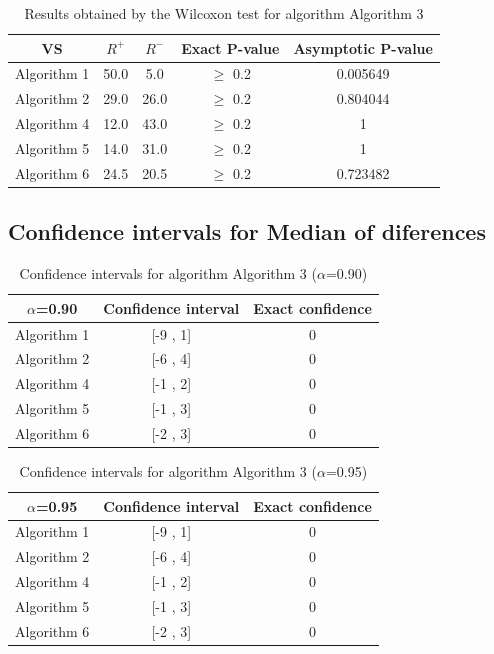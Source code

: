 \documentclass[a4paper,10pt]{article}
\begin{document}
\begin{table}[!htp]
\centering\small
\begin{tabular}{
|c|c|c|c|c|}
\hline
 VS & $R^{+}$ & $R^{-}$ & Exact P-value & Asymptotic P-value \\ \hline 
Algorithm 1 & 50.0 & 5.0 & $\geq$ 0.2 & 0.005649\\ \hline 
Algorithm 2 & 29.0 & 26.0 & $\geq$ 0.2 & 0.804044\\ \hline 
Algorithm 4 & 12.0 & 43.0 & $\geq$ 0.2 & 1\\ \hline 
Algorithm 5 & 14.0 & 31.0 & $\geq$ 0.2 & 1\\ \hline 
Algorithm 6 & 24.5 & 20.5 & $\geq$ 0.2 & 0.723482\\ \hline 

\end{tabular}
\caption{Results obtained by the Wilcoxon test for algorithm Algorithm 3}
\end{table}

\subsection{Confidence intervals for Median of diferences}

\begin{table}[!htp]
\centering\small
\begin{tabular}{
|c|c|c|}
\hline
 $\alpha$=0.90 & Confidence interval & Exact confidence \\ \hline 
Algorithm 1 & [-9 , 1] & 0\\ \hline 
Algorithm 2 & [-6 , 4] & 0\\ \hline 
Algorithm 4 & [-1 , 2] & 0\\ \hline 
Algorithm 5 & [-1 , 3] & 0\\ \hline 
Algorithm 6 & [-2 , 3] & 0\\ \hline 

\end{tabular}
\caption{Confidence intervals for algorithm Algorithm 3 ($\alpha$=0.90)}
\end{table}
\begin{table}[!htp]
\centering\small
\begin{tabular}{
|c|c|c|}
\hline
 $\alpha$=0.95 & Confidence interval & Exact confidence \\ \hline 
Algorithm 1 & [-9 , 1] & 0\\ \hline 
Algorithm 2 & [-6 , 4] & 0\\ \hline 
Algorithm 4 & [-1 , 2] & 0\\ \hline 
Algorithm 5 & [-1 , 3] & 0\\ \hline 
Algorithm 6 & [-2 , 3] & 0\\ \hline 

\end{tabular}
\caption{Confidence intervals for algorithm Algorithm 3 ($\alpha$=0.95)}
\end{table}
\end{document}
